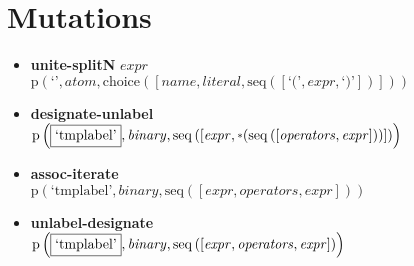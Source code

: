\section{Mutations}
{\footnotesize\begin{itemize}
\item \textbf{unite-splitN} $expr$ \\$\mathrm{p}\left(\text{`'},\mathit{atom},\mathrm{choice}\left(\left[\mathit{name}, \mathit{literal}, \mathrm{seq}\left(\left[\text{`('}, \mathit{expr}, \text{`)'}\right]\right)\right]\right)\right)$
\item \textbf{designate-unlabel}\\$\mathrm{p}\left(\fbox{\text{`tmplabel'}},\mathit{binary},\mathrm{seq}\left(\left[\mathit{expr}, \star \left(\mathrm{seq}\left(\left[\mathit{operators}, \mathit{expr}\right]\right)\right)\right]\right)\right)$
\item \textbf{assoc-iterate}\\$\mathrm{p}\left(\text{`tmplabel'},\mathit{binary},\mathrm{seq}\left(\left[\mathit{expr}, \mathit{operators}, \mathit{expr}\right]\right)\right)$
\item \textbf{unlabel-designate}\\$\mathrm{p}\left(\fbox{\text{`tmplabel'}},\mathit{binary},\mathrm{seq}\left(\left[\mathit{expr}, \mathit{operators}, \mathit{expr}\right]\right)\right)$
\end{itemize}}

